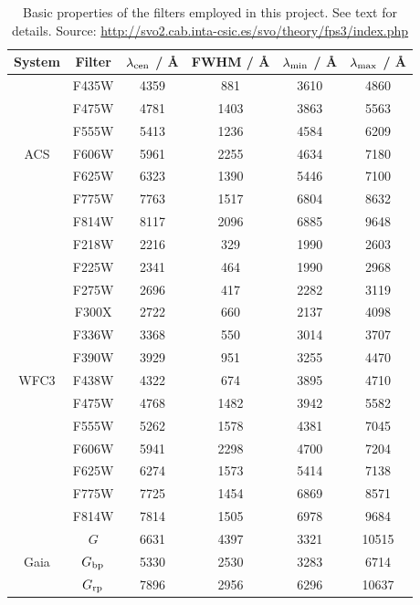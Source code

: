\documentclass[12pt, a4paper]{report}
\begin{document}
\begin{table}
\begin{center}
\begin{tabular}{cccccc}
\hline
System & Filter & $\lambda_{\textnormal{cen}}$ / \AA & FWHM / \AA & $\lambda_{\textnormal{min}}$ / \AA & $\lambda_{\textnormal{max}}$ / \AA \\
\hline
& F435W & 4359 & 881 & 3610 & 4860 \\ %
& F475W & 4781 & 1403 & 3863 & 5563 \\ %
& F555W & 5413 & 1236 & 4584 & 6209 \\ %
ACS & F606W & 5961 & 2255 & 4634 & 7180 \\ %
& F625W & 6323 & 1390 & 5446 & 7100 \\ %
& F775W & 7763 & 1517 & 6804 & 8632 \\ %
& F814W & 8117 & 2096 & 6885 & 9648 \\ %
\hline
& F218W & 2216 & 329 & 1990 & 2603 \\ %
& F225W & 2341 & 464 & 1990 & 2968 \\ %
& F275W & 2696 & 417 & 2282 & 3119 \\ %
& F300X & 2722 & 660 & 2137 & 4098 \\ %
& F336W & 3368 & 550 & 3014 & 3707 \\ %
& F390W & 3929 & 951 & 3255 & 4470 \\ %
WFC3 & F438W & 4322 & 674 & 3895 & 4710 \\ %
& F475W & 4768 & 1482 & 3942 & 5582 \\ %
& F555W & 5262 & 1578 & 4381 & 7045 \\ %
& F606W & 5941 & 2298 & 4700 & 7204 \\ %
& F625W & 6274 & 1573 & 5414 & 7138 \\ %
& F775W & 7725 & 1454 & 6869 & 8571 \\ %
& F814W & 7814 & 1505 & 6978 & 9684 \\ %
\hline
& $G$ & 6631 & 4397 & 3321 & 10515 \\ %
Gaia & $G_{\textnormal{bp}}$ & 5330 & 2530 & 3283 & 6714 \\ %
& $G_{\textnormal{rp}}$ & 7896 & 2956 & 6296 & 10637 \\ %
\hline

\end{tabular}
\caption{Basic properties of the filters employed in this project. See text for details. Source: \protect\url{http://svo2.cab.inta-csic.es/svo/theory/fps3/index.php}}
\label{filter_basics}
\end{center}
\end{table}
\end{document}
